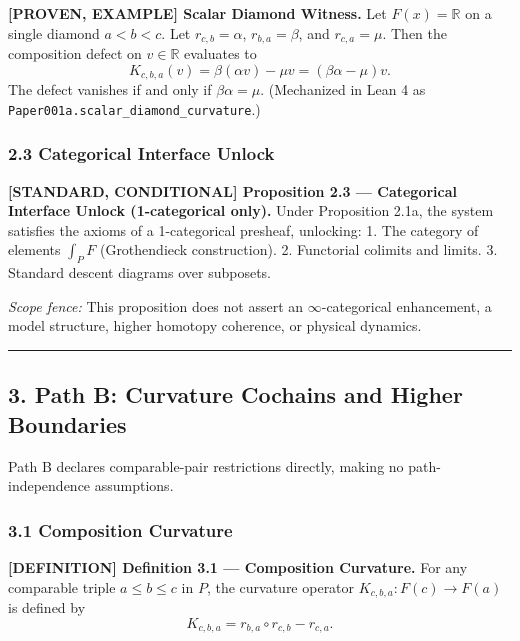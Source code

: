 \documentclass[
  english,
  10pt,
  a4paper,
]{article}
\renewenvironment{quote}
  {\begin{leftbar}\small}
  {\end{leftbar}}
\begin{document}
\begin{quote}
\textbf{{[}PROVEN, EXAMPLE{]} Scalar Diamond Witness.} Let
\(F(x)=\mathbb{R}\) on a single diamond \(a<b<c\). Let
\(r_{c,b}=\alpha\), \(r_{b,a}=\beta\), and \(r_{c,a}=\mu\). Then the
composition defect on \(v\in\mathbb{R}\) evaluates to \[
K_{c,b,a}(v)=\beta(\alpha v)-\mu v = (\beta\alpha-\mu)v.
\] The defect vanishes if and only if \(\beta\alpha=\mu\). (Mechanized
in Lean 4 as \nolinkurl{Paper001a.scalar_diamond_curvature}.)
\end{quote}

\subsubsection{2.3 Categorical Interface
Unlock}\label{categorical-interface-unlock}

\begin{quote}
\textbf{{[}STANDARD, CONDITIONAL{]} Proposition 2.3 --- Categorical
Interface Unlock (1-categorical only).} Under Proposition 2.1a, the
system satisfies the axioms of a 1-categorical presheaf, unlocking: 1.
The category of elements \(\int_P F\) (Grothendieck construction). 2.
Functorial colimits and limits. 3. Standard descent diagrams over
subposets.

\emph{Scope fence:} This proposition does not assert an
\(\infty\)-categorical enhancement, a model structure, higher homotopy
coherence, or physical dynamics.
\end{quote}

\begin{center}\rule{0.5\linewidth}{0.5pt}\end{center}

\subsection{3. Path B: Curvature Cochains and Higher
Boundaries}\label{path-b-curvature-cochains-and-higher-boundaries}

Path B declares comparable-pair restrictions directly, making no
path-independence assumptions.

\subsubsection{3.1 Composition Curvature}\label{composition-curvature}

\begin{quote}
\textbf{{[}DEFINITION{]} Definition 3.1 --- Composition Curvature.} For
any comparable triple \(a\le b\le c\) in \(P\), the curvature operator
\(K_{c,b,a}:F(c)\to F(a)\) is defined by \[
K_{c,b,a} = r_{b,a}\circ r_{c,b} - r_{c,a}.
\]
\end{quote}
\end{document}
